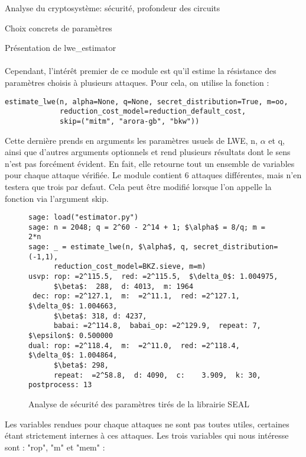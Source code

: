 \begin{section}{Analyse du cryptosystème: sécurité, profondeur des circuits}
\begin{subsection}{Choix concrets de paramètres}
\begin{subsubsection}{Présentation de lwe\_estimator}
	\paragraph{}
	Cependant, l'intérêt premier de ce module est qu'il estime la résistance des paramètres choisis à
	plusieurs attaques. Pour cela, on utilise la fonction  :
	
	\flushleft
	
	\begin{lstlisting}
estimate_lwe(n, alpha=None, q=None, secret_distribution=True, m=oo,
             reduction_cost_model=reduction_default_cost,
             skip=("mitm", "arora-gb", "bkw"))
        \end{lstlisting}
	
	\flushleft
	
	Cette dernière prends en arguments les paramètres usuels de LWE, n, $\alpha$ et q, ainsi que
	d'autres arguments optionnels et rend plusieurs résultats dont le sens n'est pas forcément évident.
	En fait, elle retourne tout un ensemble de variables pour chaque attaque vérifiée. Le module
	contient 6 attaques différentes, mais n'en testera que trois par defaut. Cela peut être modifié
	lorsque l'on appelle la fonction  via l'argument skip.
	
	\flushleft
	
	\begin{figure}
	\label{fig:seal_estimate}
	\begin{lstlisting}[mathescape=true]
sage: load("estimator.py")
sage: n = 2048; q = 2^60 - 2^14 + 1; $\alpha$ = 8/q; m = 2*n
sage: _ = estimate_lwe(n, $\alpha$, q, secret_distribution=(-1,1), 
	  reduction_cost_model=BKZ.sieve, m=m)
usvp: rop: =2^115.5,  red: =2^115.5,  $\delta_0$: 1.004975,  
      $\beta$:  288,  d: 4013,  m: 1964
 dec: rop: =2^127.1,  m:  =2^11.1,  red: =2^127.1,  $\delta_0$: 1.004663,  
      $\beta$: 318, d: 4237,  
      babai: =2^114.8,  babai_op: =2^129.9,  repeat: 7,  $\epsilon$: 0.500000
dual: rop: =2^118.4,  m:  =2^11.0,  red: =2^118.4,  $\delta_0$: 1.004864,  
      $\beta$: 298,  
      repeat:  =2^58.8,  d: 4090,  c:    3.909,  k: 30, postprocess: 13
	\end{lstlisting}
	\caption{Analyse de sécurité des paramètres tirés de la librairie SEAL}
	\end{figure}

	\flushleft
	
	Les variables rendues pour chaque attaques ne sont pas toutes utiles, certaines étant strictement
	internes à ces attaques. Les trois variables qui nous intéresse sont : "rop", "m" et "mem" :
	

\end{subsubsection}
\end{subsection}
\end{section}
